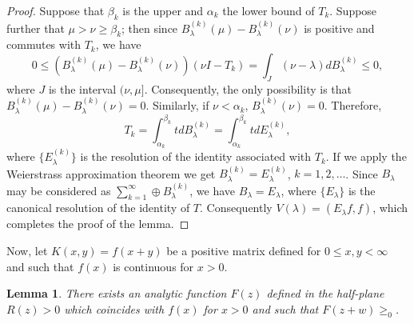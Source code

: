 \documentclass{article}
\newtheorem{lemma}{Lemma}
\begin{document}
\begin{proof}
Suppose that $\beta_k$ is the upper and $\alpha_k$ the lower bound of $T_k$. Suppose further that $\mu > \nu \geq \beta_k$; then since $B_\lambda^{(k)}(\mu) - B_\lambda^{(k)}(\nu)$ is positive and commutes with $T_k$, we have
\begin{equation}
0 \leq (B_\lambda^{(k)}(\mu) - B_\lambda^{(k)}(\nu)) (\nu I - T_k) = \int_J (\nu - \lambda) dB_\lambda^{(k)} \leq 0,
\label{eq:spectral-bound}
\end{equation}
where $J$ is the interval $(\nu, \mu]$. Consequently, the only possibility is that $B_\lambda^{(k)}(\mu) - B_\lambda^{(k)}(\nu) = 0$. Similarly, if $\nu < \alpha_k$, $B_\lambda^{(k)}(\nu) = 0$. Therefore,
\begin{equation}
T_k = \int_{\alpha_k}^{\beta_k} t dB_\lambda^{(k)} = \int_{\alpha_k}^{\beta_k} t dE_\lambda^{(k)},
\label{eq:reduced-spectral}
\end{equation}
where $\{E_\lambda^{(k)}\}$ is the resolution of the identity associated with $T_k$. If we apply the Weierstrass approximation theorem we get $B_\lambda^{(k)} = E_\lambda^{(k)}$, $k = 1, 2, \ldots$. Since $B_\lambda$ may be considered as $\sum_{k=1}^{\infty} \oplus B_\lambda^{(k)}$, we have $B_\lambda = E_\lambda$, where $\{E_\lambda\}$ is the canonical resolution of the identity of $T$. Consequently $V(\lambda) = (E_\lambda f, f)$, which completes the proof of the lemma.
\end{proof}

Now, let $K(x, y) = f(x+y)$ be a positive matrix defined for $0 \leq x, y < \infty$ and such that $f(x)$ is continuous for $x > 0$.

\begin{lemma}
\label{lem:analytic-extension}
There exists an analytic function $F(z)$ defined in the half-plane $R(z) > 0$ which coincides with $f(x)$ for $x > 0$ and such that $F(z+w) \geq_0$.
\end{lemma}
\end{document}
